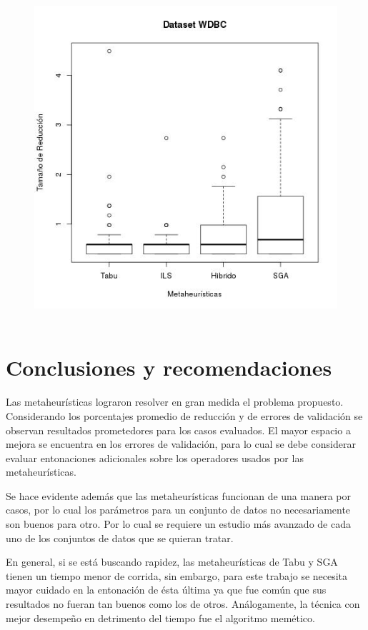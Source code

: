 \documentclass[11pt]{article}
\begin{document}
\clearpage

\begin{figure}[h!]
\begin{center}
  \includegraphics[scale=0.4]{wdbc_tam_red.jpeg}~\\[1cm]
\end{center}
\end{figure}


\section{Conclusiones y recomendaciones}

Las metaheurísticas lograron resolver en gran medida el problema propuesto. Considerando los porcentajes promedio de reducción y de errores de validación se observan resultados prometedores para los casos evaluados. El mayor espacio a mejora se encuentra en los errores de validación, para lo cual se debe considerar evaluar entonaciones adicionales sobre los operadores usados por las metaheurísticas.

Se hace evidente además que las metaheurísticas funcionan de una manera por casos, por lo cual los parámetros para un conjunto de datos no necesariamente son buenos para otro. Por lo cual se requiere un estudio más avanzado de cada uno de los conjuntos de datos que se quieran tratar.

En general, si se está buscando rapidez, las metaheurísticas de Tabu y SGA tienen un tiempo menor de corrida, sin embargo, para este trabajo se necesita mayor cuidado en la entonación de ésta última ya que fue común que sus resultados no fueran tan buenos como los de otros. Análogamente, la técnica con mejor desempeño en detrimento del tiempo fue el algoritmo memético.
\end{document}

